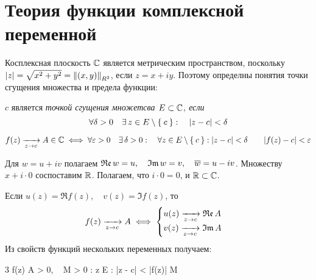 \chapter{Теория функции комплексной переменной}

Косплексная плоскость $ \mathbb{C} $ является метрическим пространством, поскольку $ |z| = \sqrt{x^2 + y^2} = \left\|{(x, y)}\right\|_{R^2} $, если $ z = x + i y $. Поэтому определны понятия точки сгущения множества и предела функции:

\begin{definition}
	$ c $ является \it{точкой сгущения} множетсва $ E \subset \mathbb{C} $, если
	$$ \forall \delta > 0 \quad \exists\, z \in E \setminus \Set{c} : \quad |z - c| < \delta $$
\end{definition}

\begin{definition}
	$$ f(z) \xrightarrow[z \to c]{} A \in \mathbb{C} \iff \forall \varepsilon > 0 \quad \exists\, \delta > 0 : \quad \forall z \in E \setminus \Set{c} : |z - c| < \delta \qquad |f(z) - c| < \varepsilon $$
\end{definition}

Для $ w = u + iv $ полагаем $ \mathfrak{Re}\, w = u, \quad \mathfrak{Im}\, w = v, \quad \overline w = u - iv $. Множеству $ x + i \cdot 0 $ соспоставим $ \mathbb{R} $. Полагаем, что $ i \cdot 0 = 0 $, и $ \mathbb{R} \subset \mathbb{C} $.

\begin{statement}
	Если $ u(z) = \Re f(z), \quad v(z) = \Im f(z) $, то
	$$ f(z) \xrightarrow[z \to c]{} A \iff
	\begin{cases}
		u(z) \xrightarrow[z \to c]{} \mathfrak{Re}\, A \\
		v(z) \xrightarrow[z \to c]{} \mathfrak{Im}\, A
	\end{cases} $$
	Из свойств функций нескольких переменных получаем:
	\begin{equ}3
		f(z)  A \in \Co \implies \exist \delta > 0, ~ M > 0 : \quad \forall z \in E \setminus {} : |z - c| < \delta \qquad |f(z)| \le M
	\end{equ}
\end{statement}

